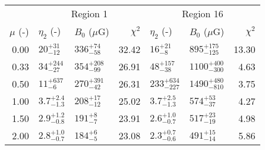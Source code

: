 \begin{tabular}{@{} r llr llr @{}}

\toprule
{} & \multicolumn{3}{c}{Region 1}
   & \multicolumn{3}{c}{Region 16} \\
\cmidrule(lr){2-4} \cmidrule(l){5-7}
$\mu$ (-) & $\eta_2$ (-) & $B_0$ ($\mu$G) & $\chi^2$
          & $\eta_2$ (-) & $B_0$ ($\mu$G) & $\chi^2$ \\
\cmidrule{1-7}
0.00 & ${20}^{+31}_{-12}$    & ${336}^{+74}_{-58}$      & 32.42
     & ${16}^{+21}_{-8}$     & ${895}^{+175}_{-125}$    & 13.30 \\
0.33 & ${34}^{+244}_{-27}$   & ${354}^{+208}_{-99}$     & 26.91
     & ${48}^{+157}_{-38}$   & ${1100}^{+400}_{-300}$   & 4.63 \\
0.50 & ${11}^{+637}_{-6}$    & ${270}^{+391}_{-42}$     & 26.31
     & ${233}^{+634}_{-227}$ & ${1490}^{+480}_{-810}$   & 3.75 \\
1.00 & ${3.7}^{+2.4}_{-1.3}$ & ${208}^{+17}_{-12}$      & 25.02
     & ${3.7}^{+2.5}_{-1.3}$ & ${574}^{+53}_{-37}$      & 4.27 \\
1.50 & ${2.9}^{+1.2}_{-0.8}$ & ${191}^{+8}_{-7}$        & 23.91
     & ${2.6}^{+1.0}_{-0.7}$ & ${517}^{+23}_{-19}$      & 4.98 \\
2.00 & ${2.8}^{+1.0}_{-0.7}$ & ${184}^{+6}_{-5}$        & 23.08
     & ${2.3}^{+0.7}_{-0.6}$ & ${491}^{+15}_{-14}$      & 5.86 \\
\bottomrule
\end{tabular}
